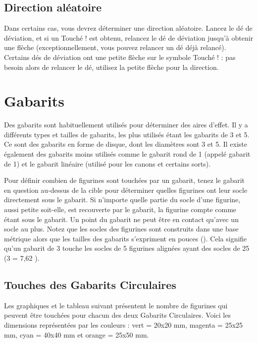 \subsection{Direction aléatoire}

Dans certains cas, vous devrez déterminer une direction aléatoire. Lancez le dé de déviation, et si un \og Touché ! \fg{} est obtenu, relancez le dé de déviation jusqu'à obtenir une flèche (exceptionnellement, vous pouvez relancer un dé déjà relancé). Certains dés de déviation ont une petite flèche sur le symbole \og Touché ! \fg{} : pas besoin alors de relancer le dé, utilisez la petite flèche pour la direction.

\section{Gabarits}

Des gabarits sont habituellement utilisés pour déterminer des aires d'effet. Il y a différents types et tailles de gabarits, les plus utilisés étant les gabarits de 3{\pouce} et 5{\pouce}. Ce sont des gabarits en forme de disque, dont les diamètres sont 3{\pouce} et 5{\pouce}. Il existe également des gabarits moins utilisés comme le gabarit rond de 1{\pouce} (appelé gabarit de 1{\pouce}) et le gabarit linéaire (utilisé pour les canons et certains sorts).

Pour définir combien de figurines sont touchées par un gabarit, tenez le gabarit en question au-dessus de la cible pour déterminer quelles figurines ont leur socle directement sous le gabarit. Si n'importe quelle partie du socle d'une figurine, aussi petite soit-elle, est recouverte par le gabarit, la figurine compte comme étant sous le gabarit. Un point du gabarit ne peut être en contact qu'avec un socle au plus. Notez que les socles des figurines sont construits dans une base métrique alors que les tailles des gabarits s'expriment en pouces (\pouce). Cela signifie qu'un gabarit de 3{\pouce} touche les socles de 5 figurines alignées ayant des socles de 25 {\milli\meter} (3{\pouce} = 7,62 {\centi\meter}).

\subsection{Touches des Gabarits Circulaires}

Les graphiques et le tableau suivant présentent le nombre de figurines qui peuvent être touchées pour chacun des deux Gabarits Circulaires. Voici les dimensions représentées par les couleurs : vert = 20x20 mm, magenta = 25x25 mm, cyan = 40x40 mm et orange = 25x50 mm.

